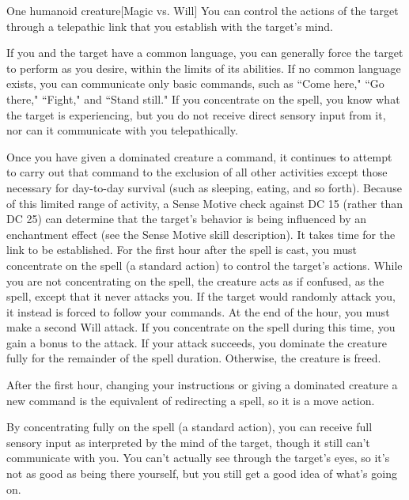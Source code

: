 \begin{spellheader}
    \spellrng{\rngmed}
\end{spellheader}
\begin{spelleffects}
    \begin{spelltarget}{One humanoid creature}[Magic vs. Will]
        \spellsuccess You can control the actions of the target through a telepathic link that you establish with the target's mind.
        \par If you and the target have a common language, you can generally force the target to perform as you desire, within the limits of its abilities. If no common language exists, you can communicate only basic commands, such as ``Come here," ``Go there," ``Fight," and ``Stand still." If you concentrate on the spell, you know what the target is experiencing, but you do not receive direct sensory input from it, nor can it communicate with you telepathically.
        \par Once you have given a dominated creature a command, it continues to attempt to carry out that command to the exclusion of all other activities except those necessary for day-to-day survival (such as sleeping, eating, and so forth). Because of this limited range of activity, a Sense Motive check against DC 15 (rather than DC 25) can determine that the target's behavior is being influenced by an enchantment effect (see the Sense Motive skill description).
        It takes time for the link to be established. For the first hour after the spell is cast, you must concentrate on the spell (a standard action) to control the target's actions. While you are not concentrating on the spell, the creature acts as if confused, as the  spell, except that it never attacks you. If the target would randomly attack you, it instead is forced to follow your commands. At the end of the hour, you must make a second Will attack. If you concentrate on the spell during this time, you gain a  bonus to the attack. If your attack succeeds, you dominate the creature fully for the remainder of the spell duration. Otherwise, the creature is freed.
        \par After the first hour, changing your instructions or giving a dominated creature a new command is the equivalent of redirecting a spell, so it is a move action.
        \par By concentrating fully on the spell (a standard action), you can receive full sensory input as interpreted by the mind of the target, though it still can't communicate with you. You can't actually see through the target's eyes, so it's not as good as being there yourself, but you still get a good idea of what's going on.

\end{spelltarget}
\end{spelleffects}

